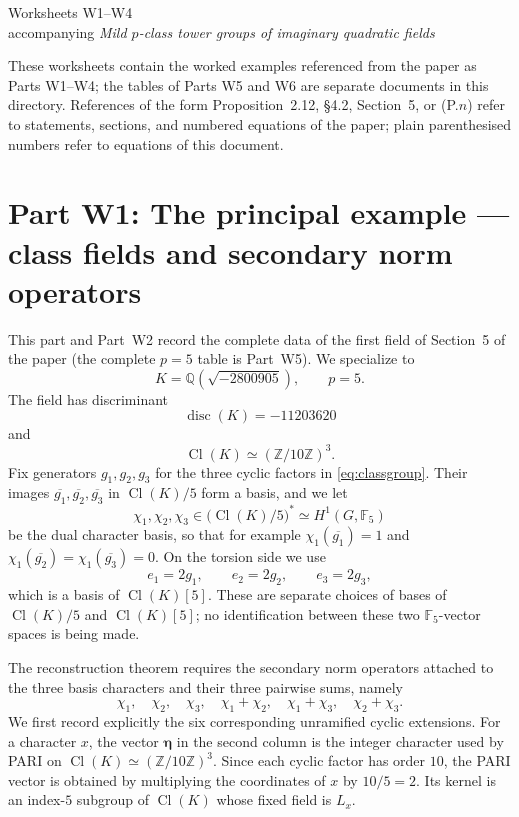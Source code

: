 \documentclass[11pt]{article}
\newcommand{\Ffive}{\mathbb F_5}
\newcommand{\Cl}{\operatorname{Cl}}
\newcommand{\disc}{\operatorname{disc}}
\begin{document}
\begin{center}
{\Large Worksheets W1--W4}\\[2mm]
accompanying \emph{Mild $p$-class tower groups of imaginary quadratic
fields}
\end{center}

\medskip
\noindent
These worksheets contain the worked examples referenced from
the paper as Parts W1--W4; the tables of Parts W5 and W6 are
separate documents in this directory.  References of the form Proposition~2.12,
\S4.2, Section~5, or (P.$n$) refer to statements, sections, and
numbered equations of the paper; plain parenthesised numbers refer to
equations of this document.

\section*{Part W1: The principal example --- class fields and secondary norm operators}

This part and Part~W2 record the complete data of the first
field of Section~5 of the paper (the complete $p=5$ table is
Part~W5).  We specialize to
\begin{equation}\label{eq:field}
  K=\mathbb Q(\sqrt{-2800905}),\qquad p=5.
\end{equation}
The field has discriminant
\[
  \disc(K)=-11203620
\]
and
\begin{equation}\label{eq:classgroup}
  \Cl(K)\simeq (\mathbb Z/10\mathbb Z)^3.
\end{equation}
Fix generators $g_1,g_2,g_3$ for the three cyclic factors in
\eqref{eq:classgroup}.  Their images $\overline{g_1},\overline{g_2},\overline{g_3}$ in
$\Cl(K)/5$ form a basis, and we let
\[
  \chi_1,\chi_2,\chi_3\in \bigl(\Cl(K)/5\bigr)^*
       \simeq H^1(G,\Ffive)
\]
be the dual character basis, so that for example
$\chi_1(\overline{g_1})=1$ and $\chi_1(\overline{g_2})=\chi_1(\overline{g_3})=0$.  On the torsion side we use
\begin{equation}\label{eq:torsion-basis}
  e_1=2g_1,\qquad e_2=2g_2,\qquad e_3=2g_3,
\end{equation}
which is a basis of $\Cl(K)[5]$.  These are separate choices of bases of
$\Cl(K)/5$ and $\Cl(K)[5]$; no identification between these two
$\Ffive$-vector spaces is being made.

The reconstruction theorem requires the secondary norm operators attached to
the three basis characters and their three pairwise sums, namely
\begin{equation}\label{eq:sixchars}
  \chi_1,\quad \chi_2,\quad \chi_3,\quad \chi_1{+}\chi_2,\quad \chi_1{+}\chi_3,\quad \chi_2{+}\chi_3.
\end{equation}
We first record explicitly the six corresponding unramified cyclic extensions.
For a character $x$, the vector $\boldsymbol{\eta}$ in the second column is
the integer character used by PARI on
$\Cl(K)\simeq(\mathbb Z/10\mathbb Z)^3$.  Since each cyclic factor has order $10$, the PARI vector is obtained
by multiplying the coordinates of $x$ by $10/5=2$.  Its kernel is an
index-$5$ subgroup of $\Cl(K)$ whose fixed field is $L_x$.
\end{document}
